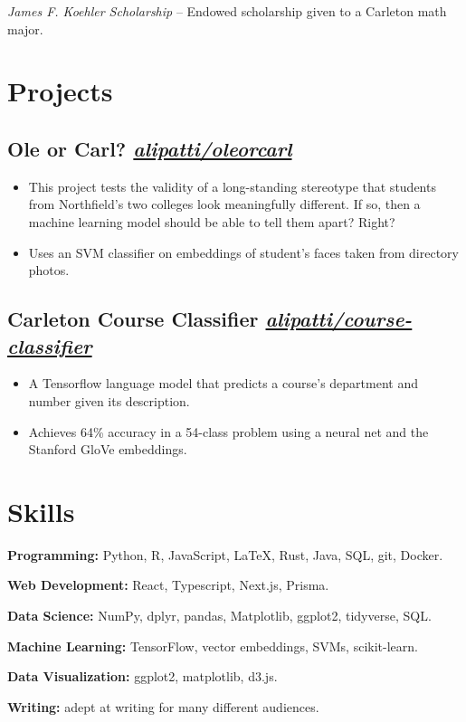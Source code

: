 \documentclass{ali-resume}
\begin{document}
\textit{James F. Koehler Scholarship} -- Endowed scholarship given to a Carleton math major.

\section{Projects}

\newcommand{\project}[2]{%
	\subsection{#1
		\hfill
		\normalfont \small \faicon{github}
		\href{http://github.com/alipatti/#2}{\textit{alipatti/#2}}
	}}

\project{Ole or Carl?}{oleorcarl}

\begin{itemize}
	\item This project tests the validity of a long-standing stereotype that students from Northfield's two colleges look meaningfully different. If so, then a machine learning model should be able to tell them apart? Right?
	\item Uses an SVM classifier on embeddings of student's faces taken from directory photos.
\end{itemize}

\project{Carleton Course Classifier}{course-classifier}

\begin{itemize}
	\item A Tensorflow language model that predicts a course's department and number given its description.
	\item Achieves 64\% accuracy in a 54-class problem using a neural net and the Stanford GloVe embeddings.
\end{itemize}

\section{Skills}

\textbf{Programming:} Python, R, JavaScript, \LaTeX, Rust, Java, SQL, git, Docker.

\textbf{Web Development:} React, Typescript, Next.js, Prisma.

\textbf{Data Science:} NumPy, dplyr, pandas, Matplotlib, ggplot2, tidyverse, SQL.

\textbf{Machine Learning:} TensorFlow, vector embeddings, SVMs, scikit-learn.

\textbf{Data Visualization:} ggplot2, matplotlib, d3.js.

\textbf{Writing:} adept at writing for many different audiences.
\end{document}
